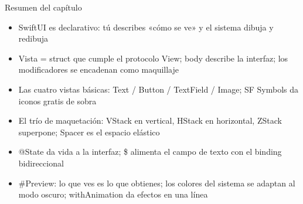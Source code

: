 \begin{tcbsummary}{Resumen del capítulo}
\begin{itemize}
  \item SwiftUI es declarativo: tú describes «cómo se ve» y el sistema dibuja y redibuja
  \item Vista = struct que cumple el protocolo View; body describe la interfaz; los modificadores se encadenan como maquillaje
  \item Las cuatro vistas básicas: Text / Button / TextField / Image; SF Symbols da iconos gratis de sobra
  \item El trío de maquetación: VStack en vertical, HStack en horizontal, ZStack superpone; Spacer es el espacio elástico
  \item @State da vida a la interfaz; \$ alimenta el campo de texto con el binding bidireccional
  \item \#Preview: lo que ves es lo que obtienes; los colores del sistema se adaptan al modo oscuro; withAnimation da efectos en una línea
\end{itemize}

\end{tcbsummary}
